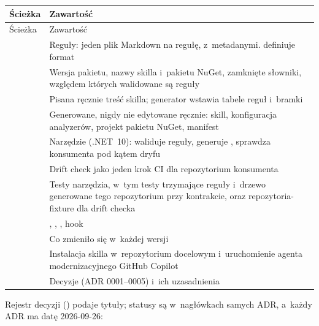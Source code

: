\begin{xltabular}{\linewidth}{@{}>{\raggedright\arraybackslash}p{4.6cm} >{\raggedright\arraybackslash}X@{}}
\toprule
Ścieżka & Zawartość \\
\midrule
\endfirsthead
\toprule
Ścieżka & Zawartość \\
\midrule
\endhead
{} & Reguły: jeden plik Markdown na regułę, z~metadanymi.  definiuje format \\
 & Wersja pakietu, nazwy skilla i~pakietu NuGet, zamknięte słowniki, względem których walidowane są reguły \\
 & Pisana ręcznie treść skilla; generator wstawia tabele reguł i~bramki \\
 & Generowane, nigdy nie edytowane ręcznie: skill, konfiguracja analyzerów, projekt pakietu NuGet, manifest \\
 & Narzędzie  (.NET~10): waliduje reguły, generuje , sprawdza konsumenta pod kątem dryfu \\
 & Drift check jako jeden krok CI dla repozytorium konsumenta \\
 & Testy narzędzia, w~tym testy trzymające reguły i~drzewo generowane tego repozytorium przy kontrakcie, oraz repozytoria-fixture dla drift checka \\
 & , , , hook  \\
 & Co zmieniło się w~każdej wersji \\
 & Instalacja skilla w~repozytorium docelowym i~uruchomienie agenta modernizacyjnego GitHub Copilot \\
 & Decyzje (ADR 0001--0005) i~ich uzasadnienia \\
\bottomrule
\end{xltabular}

Rejestr decyzji () podaje tytuły; statusy są w~nagłówkach samych
ADR, a~każdy ADR ma datę 2026-09-26:

